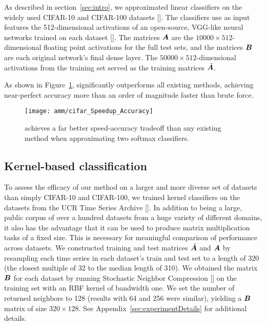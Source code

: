As described in section~\ref{sec:intro}, we approximated linear classifiers on the widely used CIFAR-10 and CIFAR-100 datasets []. The classifiers use as input features the 512-dimensional activations of an open-source, VGG-like neural networks trained on each dataset []. The matrices $\bm{A}$ are the $10000 \times 512$-dimensional floating point activations for the full test sets, and the matrices $\bm{B}$ are each original network's final dense layer. The $50000 \times 512$-dimensional activations from the training set served as the training matrices $\tilde{\bm{A}}$.

As shown in Figure~\ref{fig:cifar}, \oursp significantly outperforms all existing methods, achieving near-perfect accuracy more than an order of magnitude faster than brute force.

\begin{figure}[h]
\begin{center}
\texttt{[image: amm/cifar\_Speedup\_Accuracy]}
\caption{\oursp achieves a far better speed-accuracy tradeoff than any existing method when approximating two softmax classifiers.}
\label{fig:cifar}
\end{center}
\end{figure}

\subsection{Kernel-based classification}

To assess the efficacy of our method on a larger and more diverse set of datasets than simply CIFAR-10 and CIFAR-100, we trained kernel classifiers on the datasets from the UCR Time Series Archive []. In addition to being a large, public corpus of over a hundred datasets from a huge variety of different domains, it also has the advantage that it can be used to produce matrix multiplication tasks of a fixed size. This is necessary for meaningful comparison of performance across datasets. We constructed training and test matrices $\tilde{\bm{A}}$ and $\bm{A}$ by resampling each time series in each dataset's train and test set to a length of $320$ (the closest multiple of 32 to the median length of 310). We obtained the matrix $\bm{B}$ for each dataset by running Stochastic Neighbor Compression [] on the training set with an RBF kernel of bandwidth one. We set the number of returned neighbors to 128 (results with 64 and 256 were similar), yielding a $\bm{B}$ matrix of size $320 \times 128$. See Appendix~\ref{sec:experimentDetails} for additional details.

